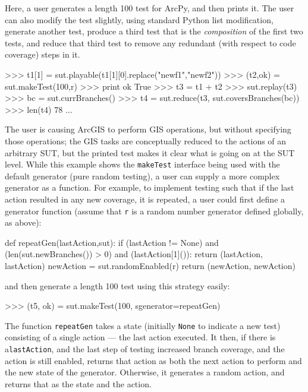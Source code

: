 Here, a user generates a length 100 test for ArcPy, and then prints it.  The user can also modify the test slightly, using standard Python list modification, generate another test, produce a third test that is the \emph{composition} of the first two tests, and reduce that third test to remove any redundant (with respect to code coverage) steps in it.

{\scriptsize
\begin{code}
 >>> t1[1] = sut.playable(t1[1][0].replace("newf1","newf2"))
 >>> (t2,ok) = sut.makeTest(100,r)
 >>> print ok
 True
 >>> t3 = t1 + t2
 >>> sut.replay(t3)
 >>> bc = sut.currBranches()
 >>> t4 = sut.reduce(t3, sut.coversBranches(bc))
 >>> len(t4)
 78
...
\end{code}
}

The user is causing ArcGIS to perform GIS operations, but without specifying those operations; the GIS tasks are conceptually reduced to the actions of an arbitrary SUT, but the printed test makes it clear what is going on at the SUT level.  While this example shows the {\tt makeTest} interface being used with the default generator (pure random testing), a user can supply a more complex generator as a function.  For example, to implement testing such that if the last action resulted in any new coverage, it is repeated, a user could first
define a generator function (assume that {\tt r} is a random number generator defined globally, as above):

{\scriptsize
\begin{code}
def repeatGen(lastAction,sut):
   if (lastAction != None) and (len(sut.newBranches()) > 0) and (lastAction[1]()):
      return (lastAction, lastAction)
   newAction = sut.randomEnabled(r)
   return (newAction, newAction)
\end{code}
}
and then generate a length 100 test using this strategy easily:
{\scriptsize
\begin{code}
 >>> (t5, ok) = sut.makeTest(100, sgenerator=repeatGen)
\end{code}
}

The function {\tt repeatGen} takes a state (initially {\tt None} to indicate a new test) consisting of a single action --- the last action executed.  It then, if there is a{\tt lastAction}, and the last step of testing increased branch coverage, and the action is still enabled, returns that action as both the next action to perform and the new state of the generator.  Otherwise, it generates a random action, and returns that as the state and the action.

